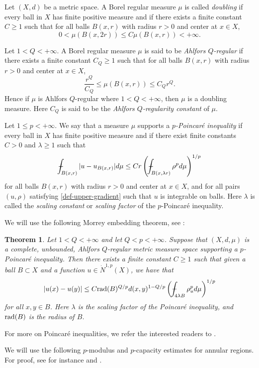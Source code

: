 \documentclass[10pt]{amsart}
\def\Xint#1{\mathchoice
	{\XXint\displaystyle\textstyle{#1}}
	{\XXint\textstyle\scriptstyle{#1}}
	{\XXint\scriptstyle\scriptscriptstyle{#1}}
	{\XXint\scriptscriptstyle\scriptscriptstyle{#1}}
	\!\int}
\def\XXint#1#2#3{{\setbox0=\hbox{$#1{#2#3}{\int}$ }
		\vcenter{\hbox{$#2#3$ }}\kern-.6\wd0}}
\def\dashint{\Xint-}
\newtheorem{theorem}{Theorem}[section]
\numberwithin{equation}{section}
\newcommand{\rad}{\text{\rm rad}}
\begin{document}
Let $(X,d)$ be a metric space. A Borel regular measure $\mu$ is called \textit{doubling} if every ball in $X$ has  finite positive  measure and if there exists a finite constant $C\geq 1$ such that for all balls $B(x,r)$  with radius $r>0$ and center at $x\in X$,
\[0<\mu(B(x,2r))\leq C\mu(B(x,r))<+\infty.
\]

Let $1< Q<{+\infty}$. A Borel regular measure $\mu$ is said to be \textit{Ahlfors $Q$-regular} if there exists a finite constant $C_Q\geq 1$ such that for all balls $B(x,r)$ with radius $r>0$ and center at $x\in X$,
\[\frac{r^Q}{C_Q}\leq \mu(B(x,r))\leq C_Qr^Q.
\] Hence if $\mu$ is Ahlfors $Q$-regular where $1<Q<{+\infty}$, then $\mu$ is a doubling measure. Here $C_Q$ is said to be the {\it Ahlfors $Q$-regularity constant} of $\mu$.

Let $1\leq p<{+\infty}$. We say that a measure $\mu$ supports a  \textit{$p$-Poincar\'e inequality} if every ball in $X$ has  finite positive measure and if there exist finite constants $C>0$ and $\lambda\geq 1$ such that 
\[\dashint_{B(x,r)}|u-u_{B(x,r)}|d\mu \leq C r\left (\dashint_{B(x,\lambda r)}\rho^pd\mu\right )^{1/p}
\] for all balls $B(x,r)$ with radius $r>0$ and center at $x\in X$, and for all pairs $(u,\rho)$ satisfying \eqref{def-upper-gradient} such that $u$ is integrable on balls. Here $\lambda$ is called the {\it scaling constant} or {\it scaling factor} of the $p$-Poincar\'e inequality. 

We will use the following Morrey embedding theorem, see \cite[Theorem~9.2.14]{pekka}:
\begin{theorem}\label{thm:Morrey}
Let $1<Q<+\infty$ and let $Q<p<+\infty$.  Suppose that $(X,d,\mu)$ is a complete, unbounded,  Ahlfors $Q$-regular metric measure space supporting a $p$-Poincar\'e inequality.  Then there exists a finite constant $C\ge 1$ such that given a ball $B\subset X$ and a function $u\in\dot N^{1,p}(X)$, we have that 
\[
|u(x)-u(y)|\le C\rad(B)^{Q/p}d(x,y)^{1-Q/p}\left(\dashint_{4\lambda B}\rho_u^pd\mu\right)^{1/p}
\]
for all $x,y\in B$.  Here $\lambda$ is the scaling factor of the Poincar\'e inequality, and $\rad(B)$ is the radius of $B$.
\end{theorem}

For more on Poincar\'e inequalities, we refer the interested readers to \cite{HK00,HK95}.
 
We will use the following $p$-modulus and $p$-capacity estimates for annular regions.  For proof, see for instance \cite[Proposition 2.17 and Lemma 3.14]{HK98} and \cite[Theorem 9.3.6]{pekka}.
\end{document}
